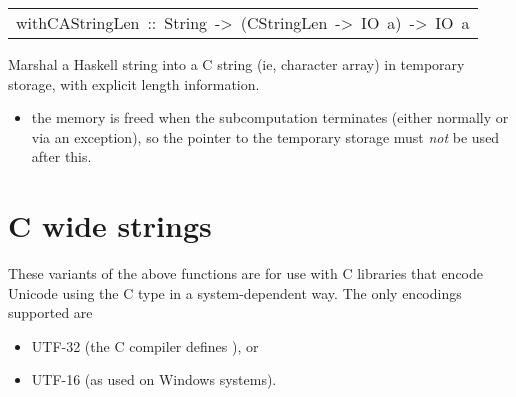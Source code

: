 \begin{haddockdesc}
\item[\begin{tabular}{@{}l}
withCAStringLen\ ::\ String\ ->\ (CStringLen\ ->\ IO\ a)\ ->\ IO\ a
\end{tabular}]\haddockbegindoc
Marshal a Haskell string into a C string (ie, character array)
 in temporary storage, with explicit length information.
\par
\begin{itemize}
\item
 the memory is freed when the subcomputation terminates (either
   normally or via an exception), so the pointer to the temporary
   storage must \emph{not} be used after this.
\par

\end{itemize}

\end{haddockdesc}
\section{C wide strings
}
These variants of the above functions are for use with C libraries
 that encode Unicode using the C  type in a system-dependent
 way.  The only encodings supported are
\par
\begin{itemize}
\item
 UTF-32 (the C compiler defines ), or
\par

\item
 UTF-16 (as used on Windows systems).
\par

\end{itemize}

